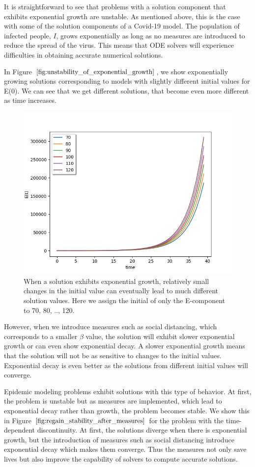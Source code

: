 It is straightforward to see that problems with a solution component that exhibits exponential growth are unstable. As mentioned above, this is the case with some of the solution components of a Covid-19 model. The population of infected people, $I$, grows exponentially as long as no measures are introduced to reduce the spread of the virus. This means that ODE solvers will experience difficulties in obtaining accurate numerical solutions. 

In Figure $\ref{fig:unstability_of_exponential_growth}$, we show exponentially growing solutions corresponding to models with slightly different initial values for E(0). We can see that we get different solutions, that become even more different as time increases.

\begin{figure}[H]
\centering
\includegraphics[width=0.7\linewidth]{./figures/unstability_of_exponential_growth}
\caption{When a solution exhibits exponential growth, relatively small changes in the initial value can eventually lead to much different solution values. Here we assign the initial of only the E-component to 70, 80, .., 120.}
\label{fig:unstability_of_exponential_growth}
\end{figure}

However, when we introduce measures such as social distancing, which corresponds to a smaller $\beta$ value, the solution will exhibit slower exponential growth or can even show exponential decay. A slower exponential growth means that the solution will not be as sensitive to changes to the initial values. Exponential decay is even better as the solutions from different initial values will converge.

Epidemic modeling problems exhibit solutions with this type of behavior. At first, the problem is unstable but as measures are implemented, which lead to exponential decay rather than growth, the problem becomes stable. We show this in Figure $\ref{fig:regain_stability_after_measures}$ for the problem with the time-dependent discontinuity. At first, the solutions diverge when there is exponential growth, but the introduction of measures such as social distancing introduce exponential decay which makes them converge. Thus the measures not only save lives but also improve the capability of solvers to compute accurate solutions.

